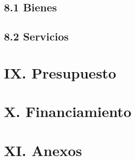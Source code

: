 \documentclass[12pt]{../componentes/uns}
\begin{document}
\subsection*{8.1 Bienes}
\lipsum[20]

\subsection*{8.2 Servicios}
\lipsum[21]

\section*{IX. Presupuesto}
\lipsum[22]

\section*{X. Financiamiento}
\lipsum[23]

\section*{XI. Anexos}
\lipsum[24]
\end{document}
